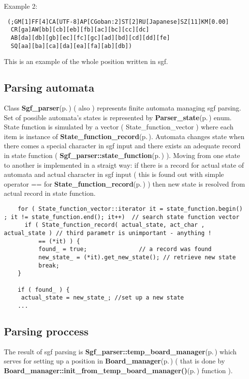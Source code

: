 Example 2:



\footnotesize\begin{verbatim} (;GM[1]FF[4]CA[UTF-8]AP[CGoban:2]ST[2]RU[Japanese]SZ[11]KM[0.00]
  CR[ga]AW[bb][cb][eb][fb][ac][bc][cc][dc]
  AB[da][db][gb][ec][fc][gc][ad][bd][cd][dd][fe]  
  SQ[aa][ba][ca][da][ea][fa][ab][db])
\end{verbatim}
\normalsize


This is an example of the whole position written in sgf.\subsection{Parsing automata}\label{page_5_page_5__sec_2}
Class {\bf Sgf\_\-parser}{\rm (p.\,\pageref{classSgf__parser})} ( also ) represents finite automata managing sgf parsing. Set of possible automata's states is represented by {\bf Parser\_\-state}{\rm (p.\,\pageref{sgf__read_8h_a7})} enum. State function is simulated by a vector ( State\_\-function\_\-vector ) where each item is instance of {\bf State\_\-function\_\-record}{\rm (p.\,\pageref{classState__function__record})}. Automata changes state when there comes a special character in sgf input and there exists an adequate record in state function ( {\bf Sgf\_\-parser::state\_\-function}{\rm (p.\,\pageref{classSgf__parser_r1})} ). Moving from one state to another is implemented in a straigt way: if there is a record for actual state of automata and actual character in sgf input ( this is found out with simple operator == for {\bf State\_\-function\_\-record}{\rm (p.\,\pageref{classState__function__record})} ) then new state is resolved from actual record in state function.

\label{page_5_page_5__resolving_new_state}
 

\footnotesize\begin{verbatim}    for ( State_function_vector::iterator it = state_function.begin() ; it != state_function.end(); it++)  // search state function vector
      if ( State_function_record( actual_state, act_char , actual_state ) // third parametr is unimportant - anything ! 
          == (*it) ) {
          found_ = true;               // a record was found
          new_state_ = (*it).get_new_state(); // retrieve new state
          break;
    }
  
    if ( found_ ) {
     actual_state = new_state_; //set up a new state
    ...
\end{verbatim}
\normalsize
\subsection{Parsing proccess}\label{page_5_page_5__sec_3}
The result of sgf parsing is {\bf Sgf\_\-parser::temp\_\-board\_\-manager}{\rm (p.\,\pageref{classSgf__parser_r12})} which serves for setting up a position in {\bf Board\_\-manager}{\rm (p.\,\pageref{classBoard__manager})} ( that is done by {\bf Board\_\-manager::init\_\-from\_\-temp\_\-board\_\-manager()}{\rm (p.\,\pageref{classBoard__manager_a14})} function ).

